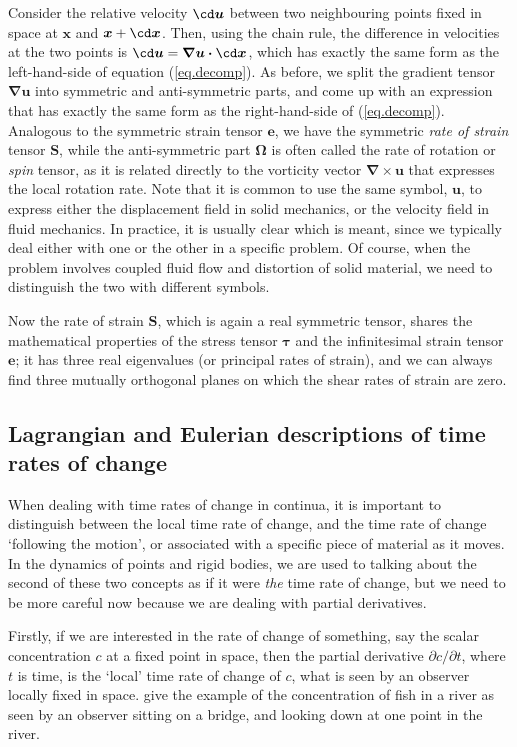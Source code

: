 \documentclass[a4paper,11pt]		{report}
\begin{document}
Consider the relative velocity $\cd\bm{u}$ between two neighbouring
points fixed in space at $\bm{x}$ and $\bm{x}+\cd\bm{x}$. Then, using
the chain rule, the difference in velocities at the two points is
$\cd\bm{u}=\bm{\nabla u\cdot}\cd\bm{x}$, which has exactly the same
form as the left-hand-side of equation (\ref{eq.decomp}). As before,
we split the gradient tensor $\bm{\nabla u}$ into symmetric and
anti-symmetric parts, and come up with an expression that has exactly
the same form as the right-hand-side of (\ref{eq.decomp}). Analogous
to the symmetric strain tensor $\bm{e}$, we have the symmetric
\emph{rate of strain} tensor $\bm{S}$, while the anti-symmetric part
$\bm{\Omega}$ is often called the rate of rotation or \emph{spin}
tensor, as it is related directly to the vorticity vector
$\bm{\nabla}\times\bm{u}$ that expresses the local rotation rate. Note
that it is common to use the same symbol, $\bm{u}$, to express either
the displacement field in solid mechanics, or the velocity field in
fluid mechanics. In practice, it is usually clear which is meant,
since we typically deal either with one or the other in a specific
problem. Of course, when the problem involves coupled fluid flow and
distortion of solid material, we need to distinguish the two with
different symbols.

Now the rate of strain $\bm{S}$, which is again a real symmetric
tensor, shares the mathematical properties of the stress tensor
$\bm{\tau}$ and the infinitesimal strain tensor $\bm{e}$; it has three
real eigenvalues (or principal rates of strain), and we can always
find three mutually orthogonal planes on which the shear rates of
strain are zero.

\subsection{Lagrangian and Eulerian descriptions of time rates of
  change}

When dealing with time rates of change in continua, it is important to
distinguish between the local time rate of change, and the time rate
of change `following the motion', or associated with a specific piece
of material as it moves. In the dynamics of points and rigid bodies,
we are used to talking about the second of these two concepts as if it
were \emph{the} time rate of change, but we need to be more careful
now because we are dealing with partial derivatives.

Firstly, if we are interested in the rate of change of something, say
the scalar concentration $c$ at a fixed point in space, then the
partial derivative $\partial c/\partial t$, where $t$ is time, is the
`local' time rate of change of $c$, \ie what is seen by an observer
locally fixed in space. \citet*{bsl62} give the example of the
concentration of fish in a river as seen by an observer sitting on a
bridge, and looking down at one point in the river.
\end{document}
